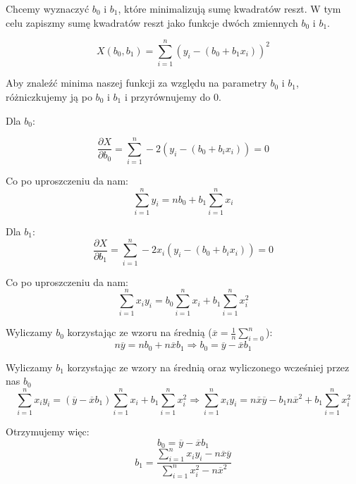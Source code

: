 \documentclass[11pt]{article}
\begin{document}
Chcemy wyznaczyć $b_0$ i $b_1$, które minimalizują sumę kwadratów reszt. W tym
celu zapiszmy sumę kwadratów reszt jako funkcje dwóch zmiennych $b_0$ i $b_1$.

\begin{equation}
  X(b_0,b_1) = \sum_{i=1}^{n} (y_i - (b_0 + b_1 x_i))^2
\end{equation}

Aby znaleźć minima naszej funkcji za względu na parametry $b_0$ i $b_1$,
różniczkujemy ją po $b_0$ i $b_1$ i przyrównujemy do 0.

Dla $b_0$:

\begin{equation}
  \frac{\partial X}{\partial b_0} = \sum_{i=1}^{n} -2(y_i - (b_0 + b_i x_i)) = 0
\end{equation}

Co po uproszczeniu da nam:
\begin{equation}
  \sum_{i=1}^{n} y_i = nb_0 + b_1 \sum_{i=1}^{n} x_i
\end{equation}

Dla $b_1$:
\begin{equation}
  \frac{\partial X}{\partial b_1} = \sum_{i=1}^{n} -2x_i(y_i - (b_0 + b_i x_i)) = 0
\end{equation}

Co po uproszczeniu da nam:
\begin{equation}
  \sum_{i=1}^{n} x_i y_i = b_0 \sum_{i=1}^{n} x_i + b_1 \sum_{i=1}^{n} x_i^2
\end{equation}

Wyliczamy $b_0$ korzystając ze wzoru na średnią ($\overline{x} = \frac{1}{n} \sum_{i=0}^{n}$):
\begin{equation}
  n \overline{y} = n b_0 + n \overline{x} b_1 \Rightarrow b_0 = \overline{y} - \overline{x} b_1
\end{equation}

Wyliczamy $b_1$ korzystając ze wzory na średnią oraz wyliczonego wcześniej przez
nas $b_0$
\begin{equation}
  \sum_{i=1}^{n} x_i y_i = (\overline{y} - \overline{x} b_1) \sum_{i=1}^{n} x_i + b_1 \sum_{i=1}^{n} x_i^2 \Rightarrow \sum_{i=1}^{n} x_i y_i = n\overline{x}\overline{y} - b_1 n \overline{x}^2 + b_1 \sum_{i=1}^{n} x_i^2
\end{equation}

Otrzymujemy więc:
\begin{equation}
b_0 = \overline{y} - \overline{x} b_1
\end{equation}
\begin{equation}
  b_1 = \frac{\sum_{i=1}^{n} x_i y_i - n\overline{x}\overline{y}}{\sum_{i=1}^{n} x_i^2 - n \overline{x}^2}
\end{equation}
\end{document}
